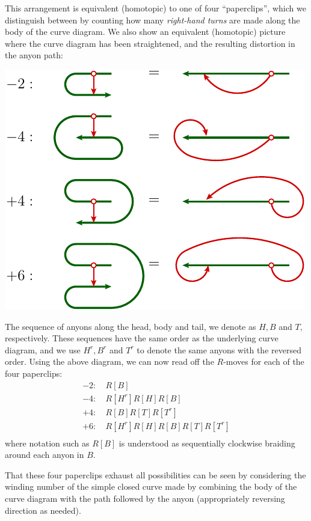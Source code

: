 \documentclass[aps, prl, letterpaper, twocolumn, superscriptaddress, notitlepage, 10pt]{revtex4-1}
\begin{document}
This arrangement is equivalent (homotopic) to one of four 
``paperclips'', which we distinguish between by counting how
many \emph{right-hand turns} are made along the body of the curve diagram.
We also show an equivalent (homotopic) picture where the
curve diagram has been straightened, and the resulting distortion
in the anyon path:
\begin{center}
\includegraphics[]{pic-paperclip.pdf}
\end{center}
The sequence of anyons along the head, body and tail, we denote as $H, B$ and $T,$
respectively.
These sequences have the same order as the underlying curve diagram, and 
we use
$H^r, B^r$ and $T^r$ to denote the same anyons with the reversed order.
Using the above diagram, we can now read off the $R$-moves for each
of the four paperclips:
\begin{align*}
-2:&\ R[B] \\
-4:&\ R[H^r] R[H] R[B] \\
+4:&\ R[B] R[T] R[T^r] \\
+6:&\ R[H^r] R[H] R[B] R[T] R[T^r] \\
\end{align*}
where notation such as $R[B]$ is understood as sequentially clockwise braiding around
each anyon in $B$.

That these four paperclips exhaust all possibilities can be seen by
considering the winding number of the simple closed curve made
by combining the body of the curve diagram with the path followed by
the anyon (appropriately reversing direction as needed).
\end{document}
